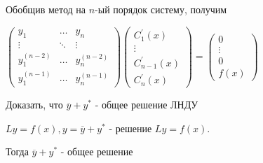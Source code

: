 \documentclass[12pt]{article}
\begin{document}
    \Nota Обобщив метод на $n$-ый порядок систему, получим

    $\begin{pmatrix}y_1 & \dots & y_n \\ \vdots & \ddots & \vdots \\ y^{(n - 2)}_1 & \dots & y^{(n - 2)}_n \\ y^{(n - 1)}_1 & \dots & y^{(n - 1)}_n\end{pmatrix}\begin{pmatrix}C^\prime_1(x) \\ \vdots \\ C^\prime_{n - 1}(x) \\ C^\prime_n(x)\end{pmatrix} = \begin{pmatrix}0 \\ \vdots \\ 0 \\ f(x)\end{pmatrix}$

    \Lab Доказать, что $\overline{y} + y^*$ - общее решение ЛНДУ


    \begin{MyTheorem}
        \Ths $Ly = f(x), y = \overline{y} + y^*$ - решение $Ly = f(x)$.

        Тогда $\overline{y} + y^*$ - общее решение
    \end{MyTheorem}
\end{document}
